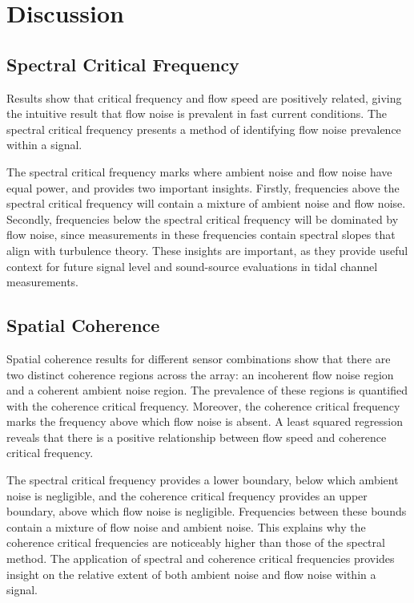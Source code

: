 \documentclass[12pt,journal,onecolumn]{IEEEtran}
\begin{document}
\section{Discussion}



\subsection{Spectral Critical Frequency}
Results show that critical frequency and flow speed are positively related, giving the intuitive result that flow noise is prevalent in fast current conditions. 
The spectral critical frequency presents a method of identifying flow noise prevalence within a signal. 

The spectral critical frequency marks where ambient noise and flow noise have equal power, and provides two important insights. Firstly, frequencies above the spectral critical frequency will contain a mixture of ambient noise and flow noise. Secondly, frequencies below the spectral critical frequency will be dominated by flow noise, since measurements in these frequencies contain spectral slopes that align with turbulence theory. These insights are important, as they provide useful context for future signal level and sound-source evaluations in tidal channel measurements. 



\subsection{Spatial Coherence}
Spatial coherence results for different sensor combinations show that there are two distinct coherence regions across the array: an incoherent flow noise region and a coherent ambient noise region. The prevalence of these regions is quantified with the coherence critical frequency. Moreover, the coherence critical frequency marks the frequency above which flow noise is absent. A least squared regression reveals that there is a positive relationship between flow speed and coherence critical frequency. 

The spectral critical frequency provides a lower boundary, below which ambient noise is negligible, and the coherence critical frequency provides an upper boundary, above which flow noise is negligible. Frequencies between these bounds contain a mixture of flow noise and ambient noise. This explains why the coherence critical frequencies are noticeably higher than those of the spectral method. The application of spectral and coherence critical frequencies provides insight on the relative extent of both ambient noise and flow noise within a signal. 
\end{document}
